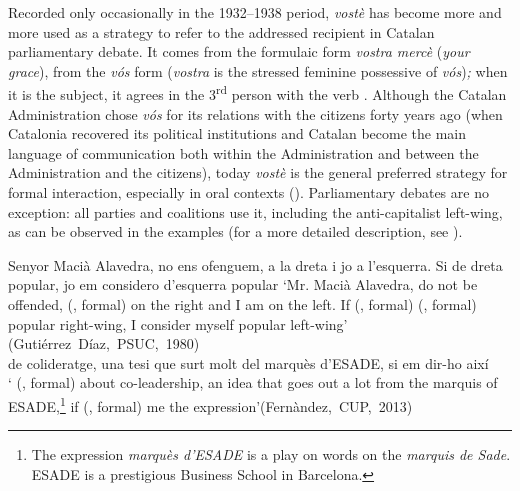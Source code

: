 \documentclass[output=paper]{langscibook}
\begin{document}
\label{sec:nogue:2.2.1.3}\largerpage


Recorded only occasionally in the 1932–1938 period, \textit{vostè} has become more and more used as a strategy to refer to the addressed recipient in Catalan parliamentary debate. It comes from the formulaic form \textit{vostra mercè} (\textit{your grace}), from the \textit{vós} form (\textit{vostra} is the stressed feminine possessive of \textit{vós})\textit{;} when it is the subject, it agrees in the 3\textsuperscript{rd} person with the verb . Although the Catalan Administration chose \textit{vós} for its relations with the citizens forty years ago (when Catalonia recovered its political institutions and Catalan become the main language of communication both within the Administration and between the Administration and the citizens), today \textit{vostè} is the general preferred strategy for formal interaction, especially in oral contexts (\citealt{Nogué2022,Payà2022}). Parliamentary debates are no exception: all parties and coalitions use it, including the anti-capitalist left-wing, as can be observed in the examples (for a more detailed description, see \cites[134–136]{Nogué2011}[232–233]{Nogué2015}).

\ea\label{ex:nogue:21}
 \ea\label{ex:nogue:21a}
{{Senyor Macià Alavedra, no ens ofenguem,}  {a la dreta i jo a l’esquerra. Si}  {de dreta popular, jo em considero d’esquerra popular}}
\glt `Mr. Macià Alavedra, do not be offended,  (,  formal)  on the right and I am on the left. If  (,  formal)   (,  formal) popular right-wing, I consider myself popular left-wing'\\\hfill\hbox{(Gutiérrez Díaz, PSUC, 1980)}\\

 \ex\label{ex:nogue:21b}
{ {de colideratge, una tesi que surt molt del marquès d’ESADE, si em}  {dir-ho així}}\\

\glt ` (,  formal)  about co-leadership, an idea that goes out a lot from the marquis of ESADE,\footnote{The expression \textit{marquès d’ESADE} is a play on words on the \textit{marquis de Sade}. ESADE is a prestigious Business School in Barcelona.} if  (,  formal)  me the expression'\hfill\hbox{(Fernàndez, CUP, 2013)}
\z\z 
\end{document}
